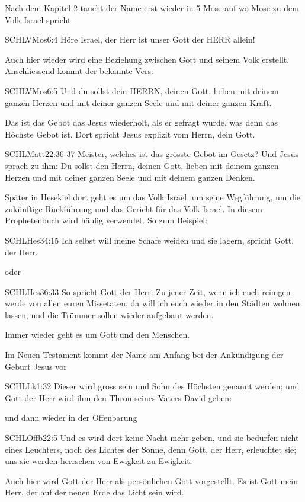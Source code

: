 \begin{otsblock}
        Nach dem Kapitel 2 taucht der Name erst wieder in 5 Mose auf wo Mose zu dem Volk Israel spricht:
        \begin{bibelbox}{SCHL}{VMos}{6:4}
            Höre Israel, der Herr ist unser Gott der HERR allein!
        \end{bibelbox}
        Auch hier wieder wird eine Beziehung zwischen Gott und seinem Volk erstellt.
        Anschliessend kommt der bekannte Vers:
        \begin{bibelbox}{SCHL}{VMos}{6:5}
            Und du sollst dein HERRN, deinen Gott, lieben mit deinem ganzen Herzen und mit deiner ganzen Seele und mit deiner ganzen Kraft.
        \end{bibelbox}
        Das ist das Gebot das Jesus wiederholt, als er gefragt wurde, was denn das Höchste Gebot ist. Dort spricht Jesus explizit vom Herrn, dein Gott.
        \begin{bibelbox}{SCHL}{Matt}{22:36-37}
            Meister, welches ist das grösste Gebot im Gesetz? Und Jesus sprach zu ihm: Du sollst den Herrn, deinen Gott, lieben mit deinem ganzen Herzen und mit deiner ganzen Seele und mit deinem ganzen Denken.
        \end{bibelbox}

        Später in Hesekiel dort geht es um das Volk Israel, um seine Wegführung, um die zukünftige Rückführung und das Gericht für das Volk Israel. In diesem Prophetenbuch wird häufig  verwendet. So zum Beispiel:
        \begin{bibelbox}{SCHL}{Hes}{34:15}
            Ich selbst will meine Schafe weiden und sie lagern, spricht Gott, der Herr.
        \end{bibelbox}
        oder
        \begin{bibelbox}{SCHL}{Hes}{36:33}
            So spricht Gott der Herr: Zu jener Zeit, wenn ich euch reinigen werde von allen euren Missetaten, da will ich euch wieder in den Städten wohnen lassen, und die Trümmer sollen wieder aufgebaut werden.
        \end{bibelbox}
        Immer wieder geht es um Gott und den Menschen.

        Im Neuen Testament kommt der Name am Anfang bei der Ankündigung der Geburt Jesus vor
        \begin{bibelbox}{SCHL}{Lk}{1:32}
            Dieser wird gross sein und Sohn des Höchsten genannt werden; und Gott der Herr wird ihm den Thron seines Vaters David geben:
        \end{bibelbox}

        und dann wieder in der Offenbarung
        \begin{bibelbox}{SCHL}{Offb}{22:5}
            Und es wird dort keine Nacht mehr geben, und sie bedürfen nicht eines Leuchters, noch des Lichtes der Sonne, denn Gott, der Herr, erleuchtet sie; uns sie werden herrschen von Ewigkeit zu Ewigkeit.
        \end{bibelbox}
        Auch hier wird Gott der Herr als persönlichen Gott vorgestellt. Es ist Gott mein Herr, der auf der neuen Erde das Licht sein wird.

    \end{otsblock}
